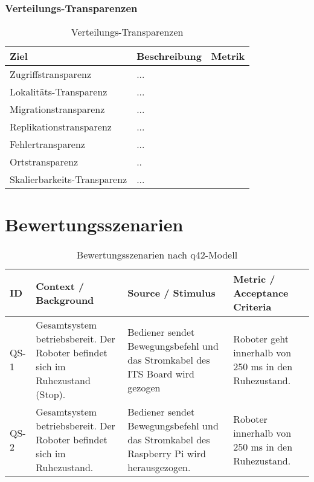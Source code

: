 \newpage
\subsubsection{Verteilungs-Transparenzen}
\begin{table}[h!]
	\centering
	\begin{tabular}{p{4cm}|p{5cm}|p{5cm}|}
		\hline
		\textbf{Ziel} & \textbf{Beschreibung} & \textbf{Metrik} \\
		\hline
		Zugriffstransparenz   & ...&\\
		\hline
		Lokalitäts-Transparenz  & ...&\\
		\hline
		Migrationstransparenz & ...&\\
		\hline
		Replikationstransparenz &...&\\
		\hline
		Fehlertransparenz &... &\\
		\hline
		Ortstransparenz & .. &\\
		\hline
		Skalierbarkeits-Transparenz & ... & \\
		\hline
	\end{tabular}
	\caption{Verteilungs-Transparenzen}
	\label{tab:transparenzen}
\end{table}

\newpage

\section{Bewertungsszenarien}
\begin{table}[h!]
\centering
\begin{tabular}{p{2cm}|p{5cm}|p{4cm}|p{5cm}}
\hline
\textbf{ID} & \textbf{Context / Background} & \textbf{Source / Stimulus} & \textbf{Metric / Acceptance Criteria} \\
\hline
QS-1 &
Gesamtsystem betriebsbereit. Der Roboter befindet sich im Ruhezustand (Stop). &
Bediener sendet Bewegungsbefehl und das Stromkabel des ITS Board wird gezogen & 
Roboter geht innerhalb von 250 ms in den Ruhezustand. \\

\hline
QS-2 &
Gesamtsystem betriebsbereit. Der Roboter befindet sich im Ruhezustand. &
Bediener sendet Bewegungsbefehl und das Stromkabel des Raspberry Pi wird herausgezogen. &
Roboter innerhalb von 250 ms in den Ruhezustand. 

\end{tabular}
\caption{Bewertungsszenarien nach q42-Modell}
\label{tab:bewertungsszenarien}
\end{table}



